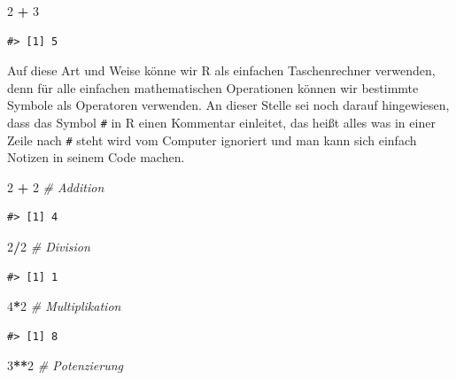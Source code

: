 \documentclass[]{book}
\newenvironment{Shaded}{\begin{snugshade}}{\end{snugshade}}
\newcommand{\DecValTok}[1]{\textcolor[rgb]{0.00,0.00,0.81}{#1}}
\newcommand{\StringTok}[1]{\textcolor[rgb]{0.31,0.60,0.02}{#1}}
\newcommand{\CommentTok}[1]{\textcolor[rgb]{0.56,0.35,0.01}{\textit{#1}}}
\newcommand{\OperatorTok}[1]{\textcolor[rgb]{0.81,0.36,0.00}{\textbf{#1}}}
\begin{document}
\begin{Shaded}
\begin{Highlighting}[]
\DecValTok{2} \OperatorTok{+}\StringTok{ }\DecValTok{3}
\end{Highlighting}
\end{Shaded}

\begin{verbatim}
#> [1] 5
\end{verbatim}

Auf diese Art und Weise könne wir R als einfachen Taschenrechner
verwenden, denn für alle einfachen mathematischen Operationen können wir
bestimmte Symbole als Operatoren verwenden. An dieser Stelle sei noch
darauf hingewiesen, dass das Symbol \texttt{\#} in R einen Kommentar
einleitet, das heißt alles was in einer Zeile nach \texttt{\#} steht
wird vom Computer ignoriert und man kann sich einfach Notizen in seinem
Code machen.

\begin{Shaded}
\begin{Highlighting}[]
\DecValTok{2} \OperatorTok{+}\StringTok{ }\DecValTok{2} \CommentTok{# Addition}
\end{Highlighting}
\end{Shaded}

\begin{verbatim}
#> [1] 4
\end{verbatim}

\begin{Shaded}
\begin{Highlighting}[]
\DecValTok{2}\OperatorTok{/}\DecValTok{2} \CommentTok{# Division}
\end{Highlighting}
\end{Shaded}

\begin{verbatim}
#> [1] 1
\end{verbatim}

\begin{Shaded}
\begin{Highlighting}[]
\DecValTok{4}\OperatorTok{*}\DecValTok{2} \CommentTok{# Multiplikation}
\end{Highlighting}
\end{Shaded}

\begin{verbatim}
#> [1] 8
\end{verbatim}

\begin{Shaded}
\begin{Highlighting}[]
\DecValTok{3}\OperatorTok{**}\DecValTok{2} \CommentTok{# Potenzierung}
\end{Highlighting}
\end{Shaded}
\end{document}
